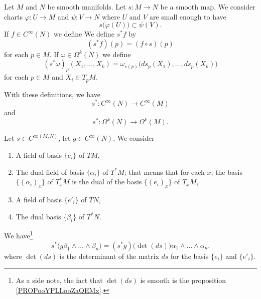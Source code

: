 \begin{proposition}		\label{PROPooLEYOooJfPtmB}
	Let \( M\) and \( N\) be smooth manifolds. Let \(s \colon M\to N  \) be a smooth map. We consider charts \(\varphi \colon U\to M  \) and \(\psi \colon V\to N  \) where \( U\) and \( V\) are small enough to have
	\begin{equation}
		s\big( \varphi(U) \big)\subset \psi(V).
	\end{equation}
	If \( f\in C^{\infty}(N)\) we define
	We define \( s^*f\) by
	\begin{equation}
		(s^*f)(p)=(f\circ s)(p)
	\end{equation}
	for each \( p\in M\). If \( \omega\in \Omega^k(N)\) we define
	\begin{equation}		\label{EQooCQBJooQpJYUf}
		(s^*\omega)_p(X_1,\ldots,X_k)  = \omega_{s(p)}\big( ds_p(X_1),\ldots,ds_p(X_k) \big)
	\end{equation}
	for each \( p\in M\) and \( X_i\in T_pM\).

	With these definitions, we have
	\begin{equation}
		s^* \colon C^{\infty}(N)\to C^{\infty}(M)
	\end{equation}
	and
	\begin{equation}
		s^* \colon \Omega^k(N)\to \Omega^k(M).
	\end{equation}
\end{proposition}

\begin{proposition}		\label{PROPooHUDYooLCAYZW}
	Let \( s\in C^{\infty(M,N)}\), let \( g\in C^{\infty}(N)\). We consider
	\begin{enumerate}
		\item
		      A field of basis \( \{ e_i \}\) of \( TM\),
		\item
		      The dual field of basis \( \{ \alpha_i \}\) of \( T^*M\); that means that for each \( x\), the basis \( \{ (\alpha_i)_x \}\) of \( T^*_xM\) is the dual of the basis \( \{ (e_i)_x \}\) of \( T_xM\),
		\item
		      A field of basis \( \{ e'_i \}\) of \( TN\),
		\item
		      The dual basis \( \{ \beta_i \}\) of \( T^*N\).
	\end{enumerate}

	We have\footnote{As a side note, the fact that \( \det(ds)\) is smooth is the proposition \ref{PROPooYPLLooZaQEMx}.}
	\begin{equation}	\label{EQooWODAooMroYCO}
		s^*\big( g\beta_1\wedge\ldots\wedge \beta_n \big)=(s^*g)\big( \det(ds) \big)\alpha_1\wedge\ldots\wedge \alpha_n.
	\end{equation}
	where \( \det(ds)\) is the determinant of the matrix \( ds\) for the basis \( \{ e_i \}\) and \( \{ e'_i \}\).
\end{proposition}

